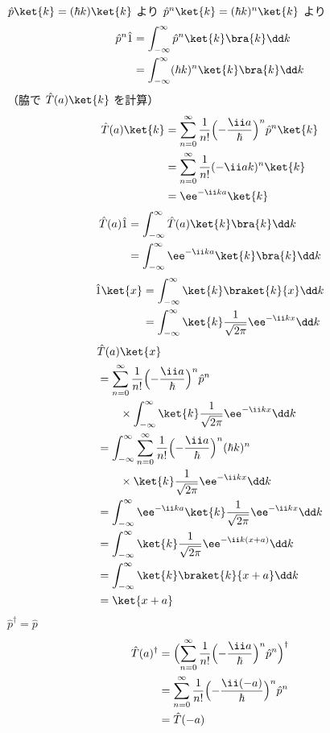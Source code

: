 $\hat{p}\ket{k}=(\hbar k)\ket{k}$ より $\hat{p}^{n}\ket{k}=(\hbar k)^{n}\ket{k}$ より
\begin{align*}
\hat{p}^{n}\hat{1}&=\int_{-\infty}^{\infty}\hat{p}^{n}\ket{k}\bra{k}\dd k\\
&=\int_{-\infty}^{\infty}(\hbar k)^{n}\ket{k}\bra{k}\dd k
\end{align*}
（脇で $\hat{T}(a)\ket{k}$ を計算）
\begin{align*}
\hat{T}(a)\ket{k}&=\sum_{n=0}^{\infty}\frac{1}{n!}\Bigl(-\frac{\ii a}{\hbar}\Bigr)^{n}\hat{p}^{n}\ket{k}\\
&=\sum_{n=0}^{\infty}\frac{1}{n!}(-\ii ak)^{n}\ket{k}\\
&=\ee^{-\ii ka}\ket{k}
\end{align*}
\begin{align*}
\hat{T}(a)\hat{1}&=\int_{-\infty}^{\infty}\hat{T}(a)\ket{k}\bra{k}\dd k\\
&=\int_{-\infty}^{\infty}\ee^{-\ii ka}\ket{k}\bra{k}\dd k
\end{align*}
\begin{align*}
\hat{1}\ket{x}&=\int_{-\infty}^{\infty}\ket{k}\braket{k}{x}\dd k\\
&=\int_{-\infty}^{\infty}\ket{k}\frac{1}{\sqrt{2\pi}}\ee^{-\ii kx}\dd k
\end{align*}
\begin{align*}
&\hat{T}(a)\ket{x}\\
&=\sum_{n=0}^{\infty}\frac{1}{n!}\Bigl(-\frac{\ii a}{\hbar}\Bigr)^{n}\hat{p}^{n}\\
&\qquad\times\int_{-\infty}^{\infty}\ket{k}\frac{1}{\sqrt{2\pi}}\ee^{-\ii kx}\dd k\\
&=\int_{-\infty}^{\infty}\sum_{n=0}^{\infty}\frac{1}{n!}\Bigl(-\frac{\ii a}{\hbar}\Bigr)^{n}(\hbar k)^{n}\\
&\qquad\times\ket{k}\frac{1}{\sqrt{2\pi}}\ee^{-\ii kx}\dd k\\
&=\int_{-\infty}^{\infty}\ee^{-\ii ka}\ket{k}\frac{1}{\sqrt{2\pi}}\ee^{-\ii kx}\dd k\\
&=\int_{-\infty}^{\infty}\ket{k}\frac{1}{\sqrt{2\pi}}\ee^{-\ii k(x+a)}\dd k\\
&=\int_{-\infty}^{\infty}\ket{k}\braket{k}{x+a}\dd k\\
&=\ket{x+a}
\end{align*}
$\hat{p}^{\dagger}=\hat{p}$
\begin{align*}
\hat{T}(a)^{\dagger}&=\Bigl(\sum_{n=0}^{\infty}\frac{1}{n!}\Bigl(-\frac{\ii a}{\hbar}\Bigr)^{n}\hat{p}^{n}\Bigr)^{\dagger}\\
&=\sum_{n=0}^{\infty}\frac{1}{n!}\Bigl(-\frac{\ii(-a)}{\hbar}\Bigr)^{n}\hat{p}^{n}\\
&=\hat{T}(-a)
\end{align*}
